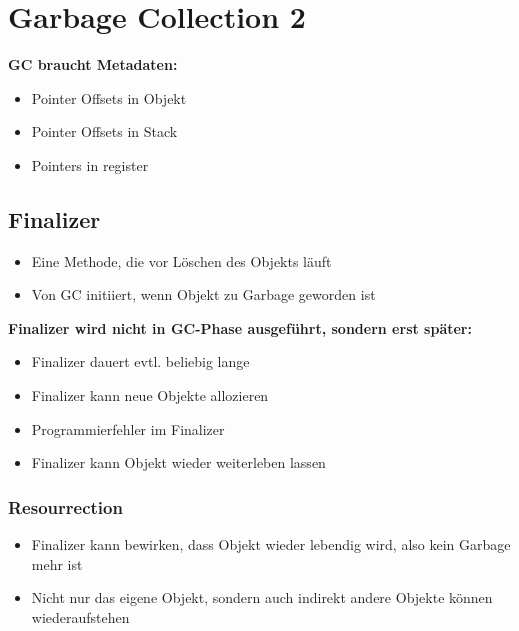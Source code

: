
\section{Garbage Collection 2}
\textbf{GC braucht Metadaten:}
\begin{itemize}[topsep=0pt]
    \itemsep -0.2em
    \item Pointer Offsets in Objekt
    \item Pointer Offsets in Stack
    \item Pointers in register
\end{itemize}

\subsection{Finalizer}
\begin{itemize}[topsep=0pt]
    \itemsep -0.2em
    \item Eine Methode, die vor Löschen des Objekts läuft
    \item Von GC initiiert, wenn Objekt zu Garbage geworden ist
\end{itemize}

\textbf{Finalizer wird nicht in GC-Phase ausgeführt, sondern erst später:}
\begin{itemize}[topsep=0pt]
    \itemsep -0.2em
    \item Finalizer dauert evtl. beliebig lange
    \item Finalizer kann neue Objekte allozieren
    \item Programmierfehler im Finalizer
    \item Finalizer kann Objekt wieder weiterleben lassen
\end{itemize}

\subsubsection{Resourrection}
\begin{itemize}[topsep=0pt]
    \itemsep -0.2em
    \item Finalizer kann bewirken, dass Objekt wieder lebendig wird, also kein Garbage mehr ist
    \item Nicht nur das eigene Objekt, sondern auch indirekt andere Objekte können wiederaufstehen
\end{itemize}

